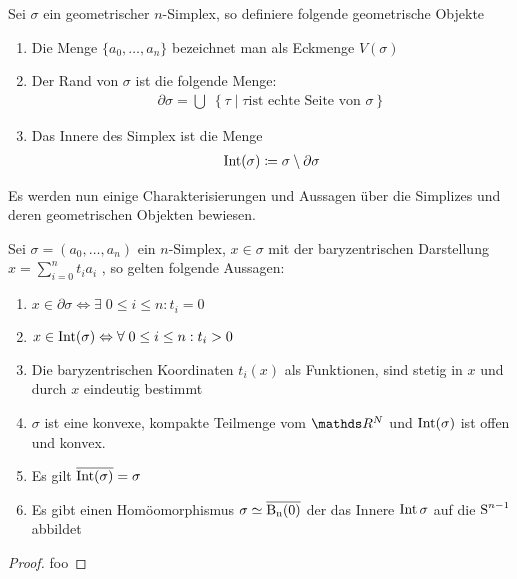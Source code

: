 \begin{Def}
  Sei $\sigma$ ein geometrischer $n$-Simplex, so definiere folgende
  geometrische Objekte
  \begin{enumerate}[{\bfseries1)}]
  \item Die Menge $\{ a_0 , \ldots , a_n \}$ bezeichnet man als
    Eckmenge $V(\sigma)$
  \item Der Rand von $\sigma$ ist die folgende Menge:
    \begin{gather*}
      \partial\sigma = \bigcup \; \left\{ \tau \; \Big| \; \tau \text{
          ist echte Seite von } \sigma \right\}
    \end{gather*}
  \item Das Innere des Simplex ist die Menge
    \begin{gather*}
    	\operatorname{Int}(\sigma) \coloneqq \sigma \setminus \partial\sigma
    \end{gather*}
  \end{enumerate}
\end{Def}

Es werden nun einige Charakterisierungen und Aussagen über die
Simplizes und deren geometrischen Objekten bewiesen.

\begin{Satz}
  \upshape Sei $\sigma = (a_0 , \ldots , a_n)$ ein $n$-Simplex,
  $x \in \sigma$ mit der baryzentrischen Darstellung
  $x=\sum\limits_{i=0}^n t_i a_i$ , so gelten folgende Aussagen:
  \begin{enumerate}[1)]%
  \item
    $x \in \partial\sigma \Leftrightarrow \exists \; 0 \leq i \leq n :
    t_i = 0$
  \item
    $x \in \operatorname{Int}(\sigma) \Leftrightarrow \forall \; 0 \leq i \leq n :
    t_i > 0$
  \item Die baryzentrischen Koordinaten $t_i(x)$ als Funktionen, sind
    stetig in $x$ und durch $x$ eindeutig bestimmt
  \item $\sigma$ ist eine konvexe, kompakte Teilmenge vom $\R^N$ und
    $\operatorname{Int}(\sigma)$ ist offen und konvex.
  \item Es gilt $\overline{\operatorname{Int}(\sigma)} = \sigma$
  \item Es gibt einen Homöomorphismus $\sigma \simeq \operatorname{\overline{\operatorname{B}_n(0)}}$ der das
    Innere $\operatorname{Int}{\sigma}$ auf die $\operatorname{S}^{n-1}$ abbildet
  \end{enumerate}
  \begin{proof}
    foo
  \end{proof}
\end{Satz}


